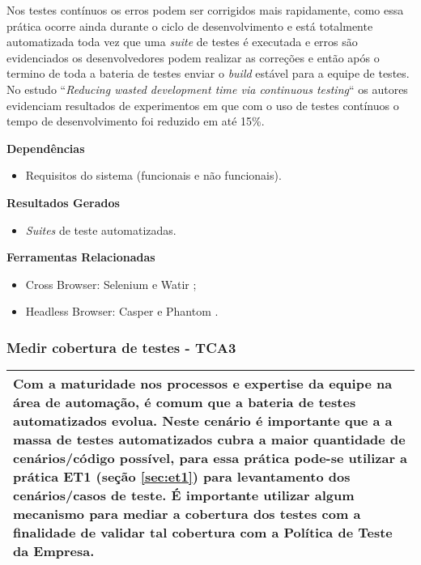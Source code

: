 Nos testes contínuos os erros podem ser corrigidos mais rapidamente, como essa prática ocorre ainda durante o ciclo de desenvolvimento e está totalmente automatizada toda vez que uma \textit{suite} de testes é executada e erros são evidenciados os desenvolvedores podem realizar as correções e então após o termino de toda a bateria de testes enviar o \textit{build} estável para a equipe de testes. No estudo “\textit{Reducing wasted development time via continuous testing}“ \cite{salf2003} os autores evidenciam resultados de experimentos em que com o uso de testes contínuos o tempo de desenvolvimento foi reduzido em até 15\%.


\textbf{Dependências}
\begin{itemize}
    \item Requisitos do sistema (funcionais e não funcionais).
\end{itemize}

\textbf{Resultados Gerados}
\begin{itemize}
    \item \textit{Suites} de teste automatizadas.

\end{itemize}

\textbf{Ferramentas Relacionadas}
\begin{itemize}
    \item Cross Browser: Selenium \cite{Selenium} e Watir \cite{Watir};
    \item Headless Browser: Casper \cite{Casper} e Phantom \cite{Phantom}.
\end{itemize}


\subsubsection{Medir cobertura de testes - TCA3}
\label{sec:tca3}

\begin{table}[H]
\centering
\begin{tabular}{|p{130mm}|}
\hline
Com a maturidade nos processos e expertise da equipe na área de automação, é comum que a bateria de testes automatizados evolua. Neste cenário é importante que a a massa de testes automatizados cubra a maior quantidade de cenários/código possível, para essa prática pode-se utilizar a prática ET1 (seção \ref{sec:et1}) para levantamento dos cenários/casos de teste.
É importante utilizar algum mecanismo para mediar a cobertura dos testes com a finalidade de validar tal cobertura com a Política de Teste da Empresa.\\ 
\hline
\end{tabular}
\end{table}

